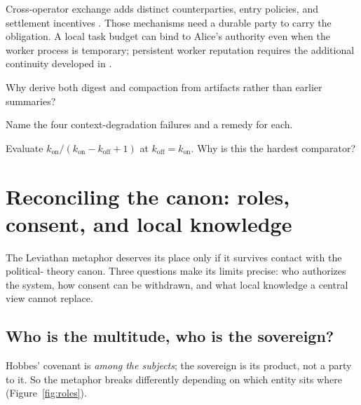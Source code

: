 \documentclass[11pt,a4paper]{article}
\theoremstyle{definition}
\theoremstyle{plain}
\begin{document}
Cross-operator exchange adds distinct counterparties, entry policies, and
settlement incentives . Those mechanisms
need a durable party to carry the obligation. A local task budget can bind to
Alice's authority even when the worker process is temporary; persistent worker
reputation requires the additional continuity developed in
.

\pdexercisepointer*{\ref{ex:ls-digest-is-compaction}}{\ref{ex:ls-paging-ratio-hand}}{\pageref{ex:ls-digest-is-compaction}}

\begin{pdrecitation}
\item Why derive both digest and compaction from artifacts rather than earlier summaries?
\item Name the four context-degradation failures and a remedy for each.
\item Evaluate $k_{\mathrm{on}}/(k_{\mathrm{on}}-k_{\mathrm{off}}+1)$ at $k_{\mathrm{off}}=k_{\mathrm{on}}$. Why is this the hardest comparator?
\end{pdrecitation}

\section{Reconciling the canon: roles, consent, and local knowledge}\label{sec:consent-canon}

The Leviathan metaphor deserves its place only if it survives contact with the political-
theory canon. Three questions make its limits precise: who authorizes the system,
how consent can be withdrawn, and what local knowledge a central view cannot replace.

\subsection{Who is the multitude, who is the sovereign?}\label{sec:roles}

Hobbes' covenant is \emph{among the subjects}; the sovereign is its product, not a
party to it. So the metaphor breaks differently depending on which entity sits where
(Figure~\ref{fig:roles}).
\end{document}
